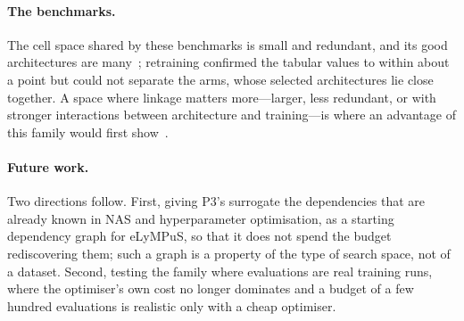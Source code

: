 \paragraph{The benchmarks.} The cell space shared by these benchmarks is small and redundant, and its good
architectures are many~\citep{lopes2023nasbenchdesign}; retraining confirmed the tabular values to within about a
point but could not separate the arms, whose selected architectures lie close together. A space where linkage matters
more---larger, less redundant, or with stronger interactions between architecture and training---is where an
advantage of this family would first show~\citep{denottelander2021localsearch,goldman2015fast}.

\paragraph{Future work.} Two directions follow. First, giving P3's surrogate the dependencies that are already known
in NAS and hyperparameter optimisation, as a starting dependency graph for eLyMPuS, so that it does not spend the
budget rediscovering them; such a graph is a property of the type of search space, not of a dataset. Second, testing
the family where evaluations are real training runs, where the optimiser's own cost no longer dominates and a
budget of a few hundred evaluations is realistic only with a cheap optimiser.
